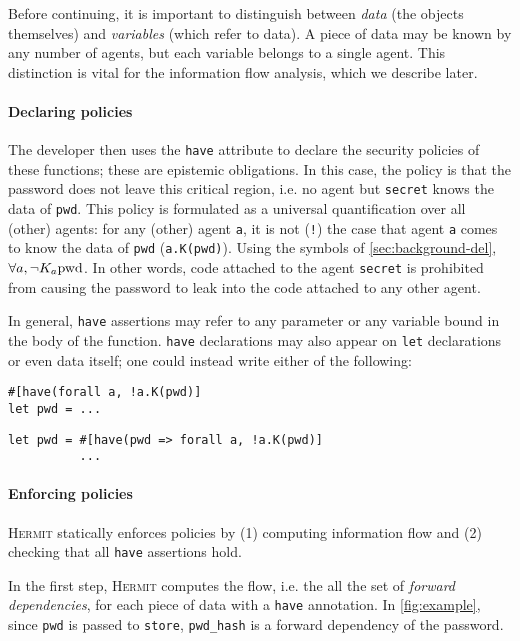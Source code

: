 \documentclass[letterpaper,twocolumn,10pt]{article}
\newcommand{\Hermit}{\textsc{Hermit}}
\begin{document}
Before continuing, it is important to distinguish between \emph{data} (the objects themselves) and
\emph{variables} (which refer to data). A piece of data may be known by any number of agents, but
each variable belongs to a single agent. This distinction is vital for the information flow
analysis, which we describe later.

\paragraph{Declaring policies}
The developer then uses the \lstinline{have} attribute to declare the security policies of these
functions; these are epistemic obligations. In this case, the policy is that the password does not
leave this critical region, i.e. no agent but \lstinline{secret} knows the data of \lstinline{pwd}.
This policy is formulated as a universal quantification over all (other) agents: for any (other)
agent \lstinline{a}, it is not (\lstinline{!}) the case that agent \lstinline{a} comes to know the
data of \lstinline{pwd} (\lstinline{a.K(pwd)}). Using the symbols of \cref{sec:background-del},
\(\forall a, \lnot K_a \text{\lstinline{pwd}}\). In other words, code attached
to the agent \lstinline{secret} is prohibited from causing the password to leak into the code
attached to any other agent.

In general, \lstinline{have} assertions may refer to any parameter or any variable bound in the body
of the function. \lstinline{have} declarations may also appear on \lstinline{let} declarations or
even data itself; one could instead write either of the following:

\begin{lstlisting}[firstnumber=16]
#[have(forall a, !a.K(pwd)]
let pwd = ...
\end{lstlisting}

\begin{lstlisting}[firstnumber=16]
let pwd = #[have(pwd => forall a, !a.K(pwd)]
          ...
\end{lstlisting}

\paragraph{Enforcing policies}
\Hermit{} statically enforces policies by (1) computing information flow and (2) checking that all
\lstinline{have} assertions hold.

In the first step, \Hermit{} computes the flow, i.e. the all the set of \emph{forward dependencies},
for each piece of data with a \lstinline{have} annotation. In \cref{fig:example}, since
\lstinline{pwd} is passed to \lstinline{store}, \lstinline{pwd_hash} is a forward dependency of the
password.
\end{document}
